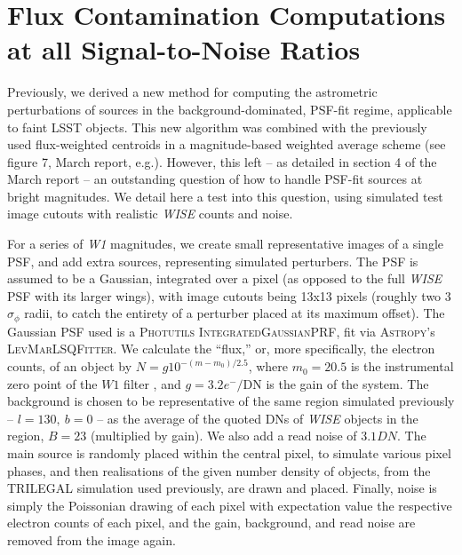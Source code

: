\documentclass[fleqn,usenatbib]{mnras}
\begin{document}
\section{Flux Contamination Computations at all Signal-to-Noise Ratios}
Previously, we derived a new method for computing the astrometric perturbations of sources in the background-dominated, PSF-fit regime, applicable to faint LSST objects.
This new algorithm was combined with the previously used flux-weighted centroids in a magnitude-based weighted average scheme (see figure 7, March report, e.g.).
However, this left -- as detailed in section 4 of the March report -- an outstanding question of how to handle PSF-fit sources at bright magnitudes.
We detail here a test into this question, using simulated test image cutouts with realistic \textit{WISE} counts and noise.

For a series of \textit{W1} magnitudes, we create small representative images of a single PSF, and add extra sources, representing simulated perturbers.
The PSF is assumed to be a Gaussian, integrated over a pixel (as opposed to the full \textit{WISE} PSF with its larger wings), with image cutouts being 13x13 pixels (roughly two 3$\sigma_\phi$ radii, to catch the entirety of a perturber placed at its maximum offset).
The Gaussian PSF used is a \textsc{Photutils} \textsc{IntegratedGaussianPRF}, fit via \textsc{Astropy}'s \textsc{LevMarLSQFitter}.
We calculate the ``flux,'' or, more specifically, the electron counts, of an object by $N = g 10^{-(m - m_0)/2.5}$, where $m_0 = 20.5$ is the instrumental zero point of the $W1$ filter , and $g = 3.2 e^-/\mathrm{DN}$ is the gain of the system.
The background is chosen to be representative of the same region simulated previously -- $l = 130,\ b = 0$ -- as the average of the quoted DNs of \textit{WISE} objects in the region, $B = 23$ (multiplied by gain).
We also add a read noise of $3.1DN$.
The main source is randomly placed within the central pixel, to simulate various pixel phases, and then realisations of the given number density of objects, from the TRILEGAL simulation used previously, are drawn and placed.
Finally, noise is simply the Poissonian drawing of each pixel with expectation value the respective electron counts of each pixel, and the gain, background, and read noise are removed from the image again.
\end{document}
